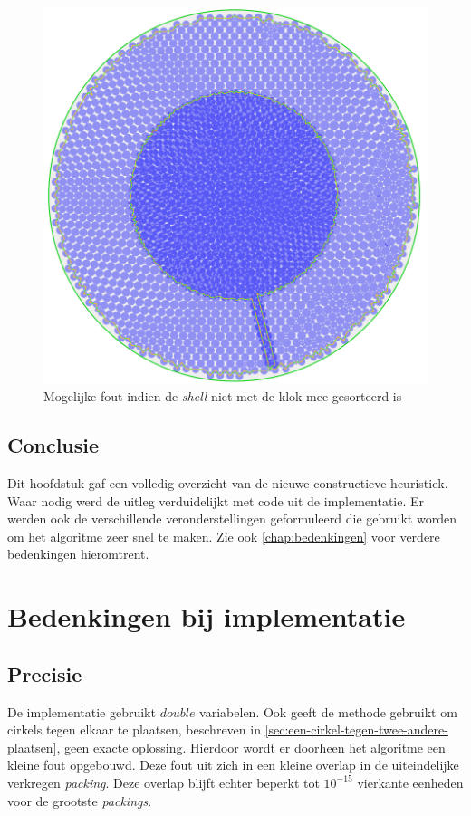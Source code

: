 \documentclass[12pt,a4paper,oneside]{book}
\begin{document}
{\begin{figure}
  \centering
  \includegraphics[width=.65\textwidth]{plaats-op-shell-hoek-fout.png}
  \caption{Mogelijke fout indien de \textit{shell} niet met de klok mee gesorteerd is} \label{fig:plaats-op-shell-hoek-fout} 
\end{figure}

\section{Conclusie}

Dit hoofdstuk gaf een volledig overzicht van de nieuwe constructieve heuristiek.
Waar nodig werd de uitleg verduidelijkt met code uit de implementatie.
Er werden ook de verschillende veronderstellingen geformuleerd die gebruikt worden om het algoritme zeer snel te maken.
Zie ook \autoref{chap:bedenkingen} voor verdere bedenkingen hieromtrent.


\chapter{Bedenkingen bij implementatie} \label{chap:bedenkingen}

\section{Precisie}

De implementatie gebruikt $double$ variabelen.
Ook geeft de methode gebruikt om cirkels tegen elkaar te plaatsen, beschreven in \autoref{sec:een-cirkel-tegen-twee-andere-plaatsen}, geen exacte oplossing.
Hierdoor wordt er doorheen het algoritme een kleine fout opgebouwd.
Deze fout uit zich in een kleine overlap in de uiteindelijke verkregen \textit{packing}.
Deze overlap blijft echter beperkt tot $10^{-15}$ vierkante eenheden voor de grootste \textit{packings}.

}
\end{document}
